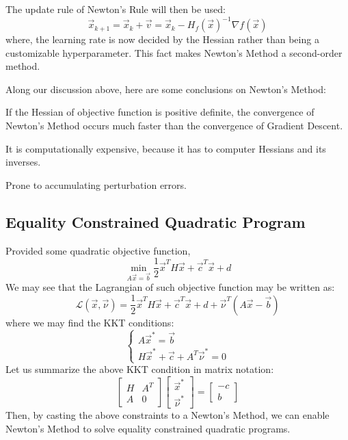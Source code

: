 The update rule of Newton's Rule will then be used:
\[
    \vec{x}_{k + 1} = \vec{x}_k + \vec{v} = \vec{x}_k - {H_f(\vec{x})}^{-1} \nabla f(\vec{x})
\]
where, the learning rate is now decided by the Hessian rather than being a customizable hyperparameter.
This fact makes Newton's Method a second-order method.

Along our discussion above, here are some conclusions on Newton's Method:
\begin{bindenum}
    \item If the Hessian of objective function is positive definite, the convergence of Newton's Method occurs much faster than the convergence of Gradient Descent.
    \item It is computationally expensive, because it has to computer Hessians and its inverses.
    \item Prone to accumulating perturbation errors.
\end{bindenum}

\subsection{Equality Constrained Quadratic Program}
Provided some quadratic objective function,
\[
    \min_{A \vec{x} = \vec{b}} \frac{1}{2} \vec{x}^T H \vec{x} + \vec{c}^T \vec{x} + d
\]
We may see that the Lagrangian of such objective function may be written as:
\[
    \mathcal{L}(\vec{x}, \vec{\nu}) = \frac{1}{2} \vec{x}^T H \vec{x} + \vec{c}^T \vec{x} + d + \vec{\nu}^T (A \vec{x} - \vec{b})
\]
where we may find the KKT conditions:
\[
    \begin{cases}
        A \vec{x}^* = \vec{b} \\
        H \vec{x}^* + \vec{c} + A^T \vec{\nu}^* = 0
    \end{cases}
\]
Let us summarize the above KKT condition in matrix notation:
\[
    \begin{bmatrix} H & A^T \\ A & 0 \end{bmatrix}
    \begin{bmatrix} \vec{x}^* \\ \vec{\nu}^* \end{bmatrix}
    = \begin{bmatrix} -c \\ b \end{bmatrix}
\]
Then, by casting the above constraints to a Newton's Method, we can enable Newton's Method to solve equality constrained quadratic programs.

